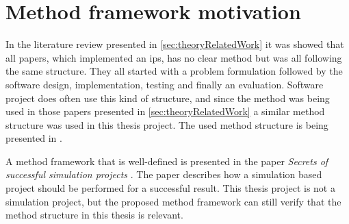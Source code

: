 \section{Method framework motivation}\label{sec:methodFramework}

In the literature review presented in \cref{sec:theoryRelatedWork} it was showed that  all papers, which implemented an \acrfull{ips}, has no clear method but was all following the same structure.
They all started with a problem formulation followed by the software design, implementation, testing and finally an evaluation.
Software project does often use this kind of structure, and since the method was being used in those papers presented in \cref{sec:theoryRelatedWork} a similar method structure was used in this thesis project.
The used method structure is being presented in .

\bigskip

A method framework that is well-defined is presented in the paper \textit{Secrets of successful simulation projects} \cite{SecretsSuccessfulSimulation1995}.
The paper describes how a simulation based project should be performed for a successful result.
This thesis project is not a simulation project, but the proposed method framework can still verify that the method structure in this thesis is relevant.

